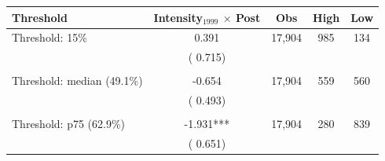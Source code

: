 \begin{tabular}{lcccc} \hline \hline
Threshold & Intensity$_{1999}$ $\times$ Post & Obs & High & Low \\ \toprule
Threshold: 15\% & 0.391 &       17,904 & 985 & 134 \\ 
 & (    0.715) & & & \\ 
  & & & & \\ 
Threshold: median (49.1\%) & -0.654 &       17,904 & 559 & 560 \\ 
 & (    0.493) & & & \\ 
  & & & & \\ 
Threshold: p75 (62.9\%) & -1.931*** &       17,904 & 280 & 839 \\ 
 & (    0.651) & & & \\ 
\bottomrule
\end{tabular}
